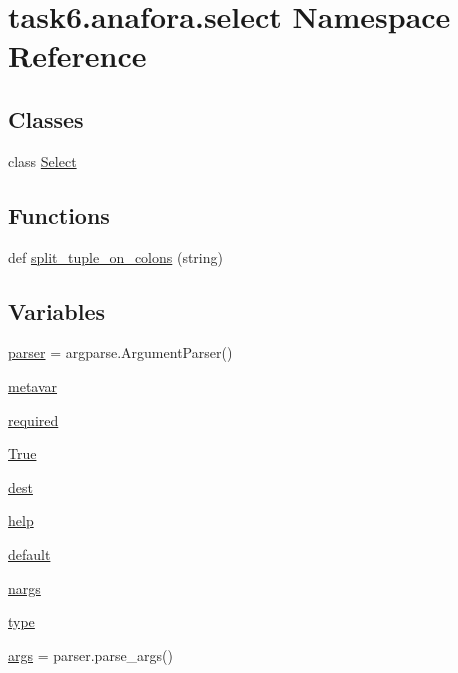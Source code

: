 \hypertarget{namespacetask6_1_1anafora_1_1select}{}\section{task6.\+anafora.\+select Namespace Reference}
\label{namespacetask6_1_1anafora_1_1select}
\subsection*{Classes}
\begin{DoxyCompactItemize}
\item 
class \hyperlink{classtask6_1_1anafora_1_1select_1_1Select}{Select}
\end{DoxyCompactItemize}
\subsection*{Functions}
\begin{DoxyCompactItemize}
\item 
def \hyperlink{namespacetask6_1_1anafora_1_1select_a073822d0d56bf39f2250b7812084da52}{split\+\_\+tuple\+\_\+on\+\_\+colons} (string)
\end{DoxyCompactItemize}
\subsection*{Variables}
\begin{DoxyCompactItemize}
\item 
\hyperlink{namespacetask6_1_1anafora_1_1select_ad0e31976834ddcb416694a9679af07c8}{parser} = argparse.\+Argument\+Parser()
\item 
\hyperlink{namespacetask6_1_1anafora_1_1select_a6df38f9271df74abf2c8b5747962c399}{metavar}
\item 
\hyperlink{namespacetask6_1_1anafora_1_1select_ab24e772d26923241ec2bcd9ae37d72a2}{required}
\item 
\hyperlink{namespacetask6_1_1anafora_1_1select_ac23312ed2565c17b75463175683d2d01}{True}
\item 
\hyperlink{namespacetask6_1_1anafora_1_1select_a8e05a2737ffa459a3459d4e1e9beeb2c}{dest}
\item 
\hyperlink{namespacetask6_1_1anafora_1_1select_a29ce56a78cefc5173e96b785ef8914b7}{help}
\item 
\hyperlink{namespacetask6_1_1anafora_1_1select_aedf6423a5d0c927c6166a827ba4f5ae3}{default}
\item 
\hyperlink{namespacetask6_1_1anafora_1_1select_ab8250a6c02ba8dd434100d947e304a78}{nargs}
\item 
\hyperlink{namespacetask6_1_1anafora_1_1select_afb6235042f2772d8823a3ba78cfeb503}{type}
\item 
\hyperlink{namespacetask6_1_1anafora_1_1select_a19255d4042579cc0022c56302a5f8c59}{args} = parser.\+parse\+\_\+args()
\end{DoxyCompactItemize}


